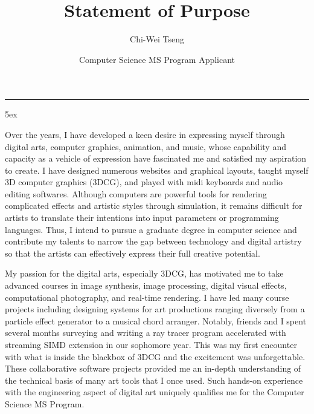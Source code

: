 \documentclass[a4paper, 11pt]{article}
\title{Statement of Purpose}
\author{Chi-Wei Tseng}
\date{Computer Science MS Program Applicant}
\makeatletter
\newcommand{\HRule}{\rule{\linewidth}{0.2mm}}
\renewcommand{\maketitle}{
  \parindent=0pt%
  \begin{flushleft}
  \bf \large{\@author} \hfill {\small \@date}
  \HRule
  \end{flushleft}
  \begin{center}
    \MakeUppercase{\bf \@title}
  \end{center}%
    \par
}
\makeatother
\begin{document}
{\large
{\linespread{0.8} \maketitle}
\parindent 5ex
}

Over the years, I have developed a keen desire in expressing myself through digital arts, computer graphics, animation, and music, whose capability and capacity as a vehicle of expression have fascinated me and satisfied my aspiration to create. I have designed numerous websites and graphical layouts, taught myself 3D computer graphics (3DCG), and played with midi keyboards and audio editing softwares. Although computers are powerful tools for rendering complicated effects and artistic styles through simulation, it remains difficult for artists to translate their intentions into input parameters or programming languages. Thus, I intend to pursue a graduate degree in computer science and contribute my talents to narrow the gap between technology and digital artistry so that the artists can effectively express their full creative potential.


My passion for the digital arts, especially 3DCG, has motivated me to take advanced courses in image synthesis, image processing, digital visual effects, computational photography, and real-time rendering. I have led many course projects including designing systems for art productions ranging diversely from a particle effect generator to a musical chord arranger. Notably, friends and I spent several months surveying and writing a ray tracer program accelerated with streaming SIMD extension in our sophomore year. This was my first encounter with what is inside the blackbox of 3DCG and the excitement was unforgettable. These collaborative software projects provided me an in-depth understanding of the technical basis of many art tools that I once used. Such hands-on experience with the engineering aspect of digital art uniquely qualifies me for the Computer Science MS Program.
\end{document}
